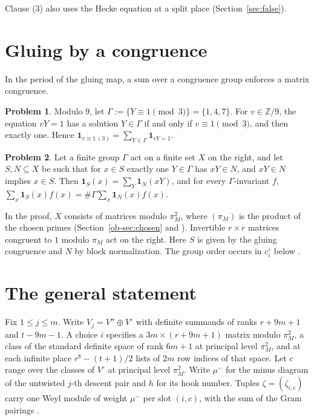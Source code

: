 \documentclass[reqno]{amsart}
\theoremstyle{definition}
\newtheorem{problem}{Problem}[section]
\theoremstyle{plain}
\theoremstyle{remark}
\newcommand{\Z}{{\mathbb{Z}}}
\begin{document}
Clause (3) also uses the Hecke equation at a split place (Section~\ref{sec:false}).

\section{Gluing by a congruence}\label{sec:glue}

In the period of the gluing map, a sum over a congruence group enforces a matrix congruence.

\begin{problem}\label{pr:glue-mod9}
Modulo \(9\), let \(\Gamma := \{Y \equiv 1 \pmod 3\} = \{1,4,7\}\).  For \(v\in\Z/9\), the equation \(vY=1\) has a solution \(Y\in\Gamma\) if and only if \(v\equiv1\pmod 3\), and then exactly one.  Hence \(\mathbf 1_{v\equiv1\,(3)} = \sum_{Y\in\Gamma}\mathbf 1_{vY=1}\).
\end{problem}

\begin{problem}\label{pr:glue-sum}
Let a finite group \(\Gamma\) act on a finite set \(X\) on the right, and let \(S, N\subseteq X\) be such that for \(x\in S\) exactly one \(Y\in\Gamma\) has \(xY\in N\), and \(xY\in N\) implies \(x\in S\).  Then \(\mathbf 1_S(x) = \sum_{Y}\mathbf 1_N(xY)\), and for every \(\Gamma\)-invariant \(f\), \(\sum_{x}\mathbf 1_S(x)f(x) = \#\Gamma\sum_x \mathbf 1_N(x)f(x)\).
\end{problem}

In the proof, \(X\) consists of matrices modulo \(\pi_M^2\), where \((\pi_M)\) is the product of the chosen primes (Section~\ref{ob-sec:chosen} and \cite[ExchangeData, line 80]{GL}).  Invertible \(r\times r\) matrices congruent to \(1\) modulo \(\pi_M\) act on the right.  Here \(S\) is given by the gluing congruence and \(N\) by block normalization.  The group order occurs in \(c^\circ_i\) below \cite[GluedLattices, lines 490--535 and GluingMaps, line 999]{GL}.

\section{The general statement}\label{sec:general}

Fix \(1\le j\le m\).  Write \(V_j=V''\oplus V^\circ\) with definite summands of ranks \(r+9m+1\) and \(t-9m-1\).  A choice \(i\) specifies a \(3m\times(r+9m+1)\) matrix modulo \(\pi_M^2\), a class of the standard definite space of rank \(6m+1\) at principal level \(\pi_M^2\), and at each infinite place \(r^8-(t+1)/2\) lists of \(2m\) row indices of that space.  Let \(c\) range over the classes of \(V^\circ\) at principal level \(\pi_M^2\).  Write \(\mu^-\) for the minus diagram of the untwisted \(j\)-th descent pair and \(h\) for its hook number.  Tuples \(\zeta=(\zeta_{i,c})\) carry one Weyl module of weight \(\mu^-\) per slot \((i,c)\), with the sum of the Gram pairings \cite[ExchangeData, lines 169--193, 294, 444--449 and GluingMaps, lines 58--88]{GL}.
\end{document}
